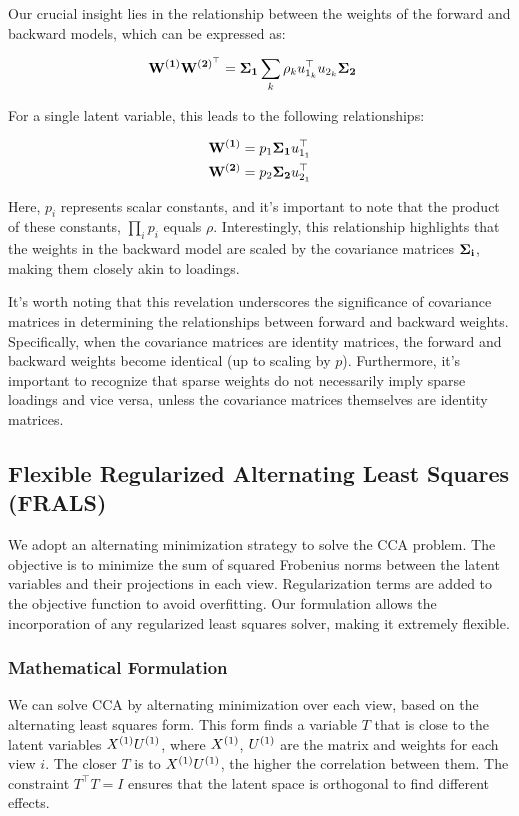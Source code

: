 Our crucial insight lies in the relationship between the weights of the forward and backward models, which can be expressed as:

\begin{align}
    \bold{W^{(1)}W^{(2)^{\top}}} &= \bold{\Sigma_1}\sum_k \rho_k u_{1_k}^\top u_{2_k} \bold{\Sigma_2}
\end{align}

For a single latent variable, this leads to the following relationships:

\begin{align}
    \bold{W^{(1)}} &= p_1\bold{\Sigma_1} u_{1_1}^\top \\
    \bold{W^{(2)}} &= p_2\bold{\Sigma_2} u_{2_1}^\top
\end{align}

Here, $p_i$ represents scalar constants, and it's important to note that the product of these constants, $\prod_i p_i$ equals $\rho$.
Interestingly, this relationship highlights that the weights in the backward model are scaled by the covariance matrices $\bold{\Sigma_i}$, making them closely akin to loadings.

It's worth noting that this revelation underscores the significance of covariance matrices in determining the relationships between forward and backward weights.
Specifically, when the covariance matrices are identity matrices, the forward and backward weights become identical (up to scaling by $p$).
Furthermore, it's important to recognize that sparse weights do not necessarily imply sparse loadings and vice versa, unless the covariance matrices themselves are identity matrices.


\subsection{Flexible Regularized Alternating Least Squares (FRALS)}\label{subsec:flexible-regularized-alternating-least
-squares-(frals)}
We adopt an alternating minimization strategy to solve the CCA problem.
The objective is to minimize the sum of squared Frobenius norms between the latent variables and their projections in each view.
Regularization terms are added to the objective function to avoid overfitting.
Our formulation allows the incorporation of any regularized least squares solver, making it extremely flexible.

\subsubsection{Mathematical Formulation}
We can solve CCA by alternating minimization over each view, based on the alternating least squares form.
This form finds a variable \( T \) that is close to the latent variables \( X^{(1)} U^{(1)} \), where \( X^{(1)} \), \( U^{(1)} \) are the matrix and weights for each view \( i \).
The closer \( T \) is to \( X^{(1)} U^{(1)} \), the higher the correlation between them.
The constraint \( T^\top T = I \) ensures that the latent space is orthogonal to find different effects.

